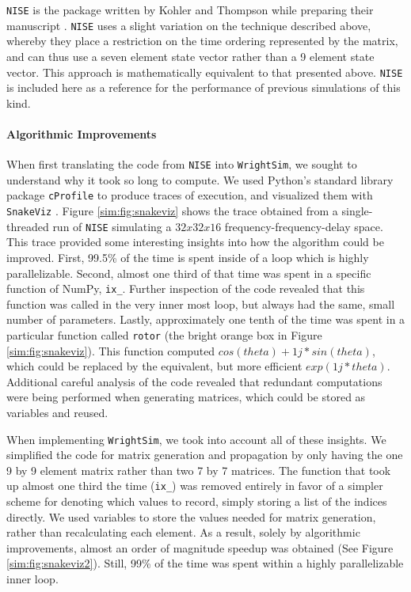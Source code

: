 \texttt{NISE} \cite{nise} is the package written by Kohler and
Thompson while preparing their manuscript \cite{KohlerDanielDavid2017a}.
\texttt{NISE} uses a slight variation on the technique described above,
whereby they place a restriction on the time ordering represented by the
matrix, and can thus use a seven element state vector rather than a 9
element state vector. This approach is mathematically equivalent to that
presented above. \texttt{NISE} is included here as a reference for the
performance of previous simulations of this kind.

\hypertarget{algorithmic-improvements}{%
\paragraph{Algorithmic
Improvements}\label{algorithmic-improvements}}

When first translating the code from \texttt{NISE} into
\texttt{WrightSim}, we sought to understand why it took so long to
compute. We used Python's standard library package \texttt{cProfile} to
produce traces of execution, and visualized them with \texttt{SnakeViz}
\cite{snakeviz}. Figure \ref{sim:fig:snakeviz} shows the trace obtained
from a single-threaded run of \texttt{NISE} simulating a
\(32 x 32 x 16\) frequency-frequency-delay space. This trace provided
some interesting insights into how the algorithm could be improved.
First, 99.5\% of the time is spent inside of a loop which is highly
parallelizable. Second, almost one third of that time was spent in a
specific function of NumPy, \texttt{ix\_}. Further inspection of the
code revealed that this function was called in the very inner most loop,
but always had the same, small number of parameters. Lastly,
approximately one tenth of the time was spent in a particular function
called \texttt{rotor} (the bright orange box in Figure
\ref{sim:fig:snakeviz}). This function computed
\(cos(theta) + 1j * sin(theta)\), which could be replaced by the
equivalent, but more efficient \(exp(1j * theta)\). Additional careful
analysis of the code revealed that redundant computations were being
performed when generating matrices, which could be stored as variables
and reused.

When implementing \texttt{WrightSim}, we took into account all of these
insights. We simplified the code for matrix generation and propagation
by only having the one 9 by 9 element matrix rather than two 7 by 7
matrices. The function that took up almost one third the time
(\texttt{ix\_}) was removed entirely in favor of a simpler scheme for
denoting which values to record, simply storing a list of the indices
directly. We used variables to store the values needed for matrix
generation, rather than recalculating each element. As a result, solely
by algorithmic improvements, almost an order of magnitude speedup was
obtained (See Figure \ref{sim:fig:snakeviz2}). Still, 99\% of the time
was spent within a highly parallelizable inner loop.

